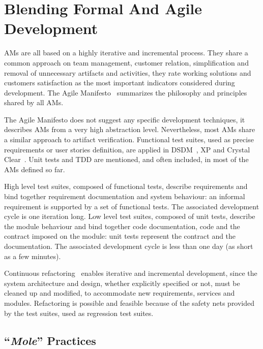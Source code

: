 \documentclass[english]{lni}
\newcommand{\mole}{``\emph{Mole}''\xspace}
\begin{document}
\section{Blending Formal And Agile Development}
\label{sec:blending_formal_and_agile_development}

AMs are all based on a highly iterative and incremental process.
They share a common approach on team management, customer relation, simplification and removal of unnecessary artifacts and activities, they rate working solutions and customers satisfaction as the most important indicators considered during development.
The Agile Manifesto~\cite{Beck2001} summarizes the philosophy and principles shared by all AMs.

The Agile Manifesto does not suggest any specific development techniques, it describes AMs from a very high abstraction level.
Nevertheless, most AMs share a similar approach to artifact verification.
Functional test suites, used as precise requirements or user stories definition, are applied in DSDM~\cite{Stapleton1997}, XP and Crystal Clear~\cite{Cockburn2004}. 
Unit tests and TDD are mentioned, and often included, in most of the AMs defined so far.

High level test suites, composed of functional tests, describe requirements and bind together requirement documentation and system behaviour: an informal requirement is supported by a set of functional tests. 
The associated development cycle is one iteration long. 
Low level test suites, composed of unit tests, describe the module behaviour and bind together code documentation, code and the contract imposed on the module: unit tests represent the contract and the documentation. 
The associated development cycle is less than one day (as short as a few minutes).

Continuous refactoring~\cite{Fowler1999} enables iterative and incremental development, since the system architecture and design, whether explicitly specified or not, must be cleaned up and modified, to accommodate new requirements, services and modules.
Refactoring is possible and feasible because of the safety nets provided by the test suites, used as regression test suites.

\subsection{\mole Practices}
\end{document}
